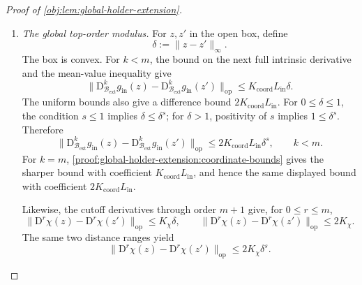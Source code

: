 \documentclass[11pt]{article}
\begin{document}
\begin{proof}[Proof of \cref{obj:lem:global-holder-extension}]
\begin{enumerate}
\item\label{proof:global-holder-extension:global-modulus} \emph{The global top-order modulus.}
For \(z,z'\) in the open box, define
\[
\delta:=\|z-z'\|_\infty.
\]
The box is convex. For \(k<m\), the bound on the next full intrinsic derivative and the mean-value inequality give
\[
\|\mathrm D_{\mathcal B_{\mathrm{ext}}}^{k}g_{\mathrm{in}}(z)
-\mathrm D_{\mathcal B_{\mathrm{ext}}}^{k}g_{\mathrm{in}}(z')\|_{\mathrm{op}}
\le K_{\mathrm{coord}}L_{\mathrm{in}}\delta.
\]
The uniform bounds also give a difference bound
\(2K_{\mathrm{coord}}L_{\mathrm{in}}\). For \(0\le\delta\le1\), the condition \(s\le1\) implies \(\delta\le\delta^s\); for \(\delta>1\), positivity of \(s\) implies \(1\le\delta^s\). Therefore
\[
\|\mathrm D_{\mathcal B_{\mathrm{ext}}}^{k}g_{\mathrm{in}}(z)
-\mathrm D_{\mathcal B_{\mathrm{ext}}}^{k}g_{\mathrm{in}}(z')\|_{\mathrm{op}}
\le2K_{\mathrm{coord}}L_{\mathrm{in}}\delta^s,
\qquad k<m.
\]
For \(k=m\), \cref{proof:global-holder-extension:coordinate-bounds} gives the sharper bound with coefficient
\(K_{\mathrm{coord}}L_{\mathrm{in}}\), and hence the same displayed bound with coefficient \(2K_{\mathrm{coord}}L_{\mathrm{in}}\).

Likewise, the cutoff derivatives through order \(m+1\) give, for \(0\le r\le m\),
\[
\|\mathrm D^r\chi(z)-\mathrm D^r\chi(z')\|_{\mathrm{op}}
\le K_\chi\delta,
\qquad
\|\mathrm D^r\chi(z)-\mathrm D^r\chi(z')\|_{\mathrm{op}}
\le2K_\chi.
\]
The same two distance ranges yield
\[
\|\mathrm D^r\chi(z)-\mathrm D^r\chi(z')\|_{\mathrm{op}}
\le2K_\chi\delta^s.
\]


\end{enumerate}
\end{proof}
\end{document}
